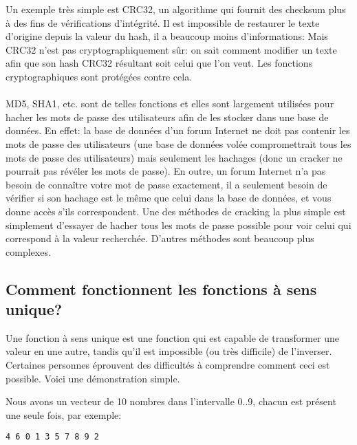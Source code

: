 ﻿\newcommand{\HashFuncChapterName}{Fonctions de hachage}
\mysection{\HashFuncChapterName}
\label{hash_func}

\myindex{\HashFuncChapterName}
Un exemple très simple est CRC32, un algorithme qui fournit des checksum plus 
à des fins de vérifications d'intégrité.
Il est impossible de restaurer le texte d'origine depuis la valeur du hash, il a
beaucoup moins d'informations:
Mais CRC32 n'est pas cryptographiquement sûr: on sait comment modifier un texte afin
que son hash CRC32 résultant soit celui que l'on veut.
Les fonctions cryptographiques sont protégées contre cela.\\
\\
MD5, SHA1, etc. sont de telles fonctions et elles sont largement utilisées pour hacher
les mots de passe des utilisateurs afin de les stocker dans une base de données.
En effet: la base de données d'un forum Internet ne doit pas contenir les mots de
passe des utilisateurs (une base de données volée compromettrait tous les mots de
passe des utilisateurs) mais seulement les hachages (donc un cracker ne pourrait
pas révéler les mots de passe).
En outre, un forum Internet n'a pas besoin de connaître votre mot de passe exactement,
il a seulement besoin de vérifier si son hachage est le même que celui dans la base
de données, et vous donne accès s'ils correspondent.
Une des méthodes de cracking la plus simple est simplement d'essayer de hacher tous
les mots de passe possible pour voir celui qui correspond à la valeur recherchée.
D'autres méthodes sont beaucoup plus complexes.

\subsection{Comment fonctionnent les fonctions à sens unique?}

Une fonction à sens unique est une fonction qui est capable de transformer une valeur
en une autre, tandis qu'il est impossible (ou très difficile) de l'inverser.
Certaines personnes éprouvent des difficultés à comprendre comment ceci est possible.
Voici une démonstration simple.

Nous avons un vecteur de 10 nombres dans l'intervalle 0..9, chacun est présent une
seule fois, par exemple:

\begin{lstlisting}
4 6 0 1 3 5 7 8 9 2
\end{lstlisting}

